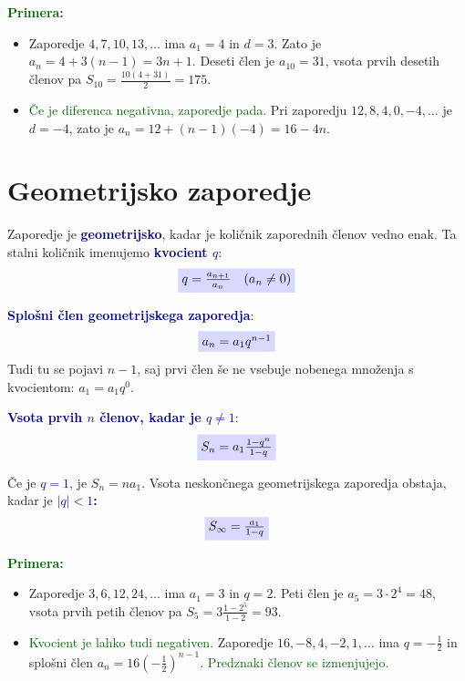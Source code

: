 \documentclass[12pt,a4paper]{article}
\begin{document}
\textcolor{darkgreen}{\textbf{Primera:}}
\begin{itemize}
    \item Zaporedje $4, 7, 10, 13, \ldots$ ima $a_1=4$ in $d=3$. Zato je $a_n=4+3(n-1)=3n+1$. Deseti člen je $a_{10}=31$, vsota prvih desetih členov pa $S_{10}=\frac{10(4+31)}{2}=175$.
    \item \textcolor{darkgreen}{Če je diferenca negativna, zaporedje pada.} Pri zaporedju $12, 8, 4, 0, -4, \ldots$ je $d=-4$, zato je $a_n=12+(n-1)(-4)=16-4n$.
\end{itemize}

\section{Geometrijsko zaporedje}

Zaporedje je \textcolor{darkblue}{\textbf{geometrijsko}}, kadar je količnik zaporednih členov vedno enak. Ta stalni količnik imenujemo \textcolor{darkblue}{\textbf{kvocient $q$}}:
\[
    \colorbox{blue!15}{$q=\frac{a_{n+1}}{a_n} \quad (a_n\ne 0)$}
\]

\textcolor{darkblue}{\textbf{Splošni člen geometrijskega zaporedja}}:
\[
    \colorbox{blue!15}{$a_n=a_1q^{n-1}$}
\]
Tudi tu se pojavi $n-1$, saj prvi člen še ne vsebuje nobenega množenja s kvocientom: $a_1=a_1q^0$.

\medskip

\textcolor{darkblue}{\textbf{Vsota prvih $n$ členov, kadar je $q\ne1$}}:
\[
    \colorbox{blue!15}{$S_n=a_1\frac{1-q^n}{1-q}$}
\]

Če je \textcolor{darkblue}{\textbf{$q=1$}}, je \colorbox{blue!15}{$S_n=na_1$}. Vsota neskončnega geometrijskega zaporedja obstaja, kadar je \textcolor{darkblue}{\textbf{$|q|<1$:}}
\[
    \colorbox{blue!15}{$S_\infty=\frac{a_1}{1-q}$}
\]

\medskip

\textcolor{darkgreen}{\textbf{Primera:}} 
\begin{itemize}
    \item Zaporedje $3, 6, 12, 24, \ldots$ ima $a_1=3$ in $q=2$. Peti člen je $a_5=3\cdot2^4=48$, vsota prvih petih členov pa $S_5=3\frac{1-2^5}{1-2}=93$.
    \item \textcolor{darkgreen}{Kvocient je lahko tudi negativen.} Zaporedje $16, -8, 4, -2, 1, \ldots$ ima $q=-\frac12$ in splošni člen $a_n=16\left(-\frac12\right)^{n-1}$. \textcolor{darkgreen}{Predznaki členov se izmenjujejo.}
\end{itemize}
\end{document}
